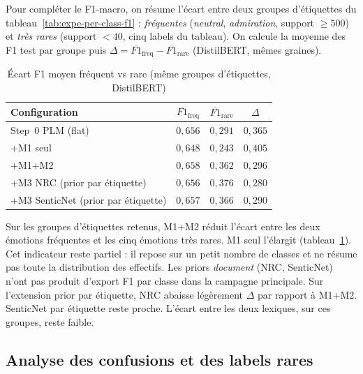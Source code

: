 Pour compléter le F1-macro, on résume l'écart entre deux groupes d'étiquettes
du tableau~\ref{tab:expe-per-class-f1} : \emph{fréquentes} (\emph{neutral},
\emph{admiration}, support $\geq 500$) et \emph{très rares} (support
$< 40$, cinq labels du tableau). On calcule la moyenne des F1 test par
groupe puis $\Delta = \overline{F1}_{\mathrm{freq}} -
\overline{F1}_{\mathrm{rare}}$ (DistilBERT, mêmes graines).
\begin{table}[H]
\centering
\caption{Écart F1 moyen fréquent vs rare (même groupes d'étiquettes, DistilBERT)}
\label{tab:expe-freq-rare-gap}
\renewcommand{\arraystretch}{1.2}
\begin{tabular}{|l|c|c|c|}
\hline
\textbf{Configuration} & $\overline{F1}_{\mathrm{freq}}$ & $\overline{F1}_{\mathrm{rare}}$ & $\Delta$ \\
\hline
Step~0 PLM (flat) & $0{,}656$ & $0{,}291$ & $0{,}365$ \\
\hline
+M1 seul & $0{,}648$ & $0{,}243$ & $0{,}405$ \\
\hline
+M1+M2 & $0{,}658$ & $0{,}362$ & $0{,}296$ \\
\hline
+M3 NRC (prior par étiquette) & $0{,}656$ & $0{,}376$ & $0{,}280$ \\
\hline
+M3 SenticNet (prior par étiquette) & $0{,}657$ & $0{,}366$ & $0{,}290$ \\
\hline
\end{tabular}
\end{table}
Sur les groupes d'étiquettes retenus, M1+M2 réduit l'écart entre les
deux émotions fréquentes et les cinq émotions très rares. M1 seul
l'élargit (tableau~\ref{tab:expe-freq-rare-gap}). Cet indicateur reste
partiel : il repose sur un petit nombre de classes et ne résume pas
toute la distribution des effectifs. Les priors \emph{document} (NRC,
SenticNet) n'ont pas produit d'export F1 par classe dans la campagne
principale. Sur l'extension prior par étiquette, NRC abaisse légèrement
$\Delta$ par rapport à M1+M2. SenticNet par étiquette reste proche.
L'écart entre les deux lexiques, sur ces groupes, reste faible.

\subsection{Analyse des confusions et des labels rares}
\label{sec:expe-error-analysis}

